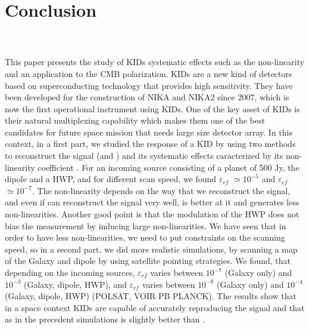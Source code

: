 
\section{Conclusion}
\label{conclusion}

\\

\\

This paper presents the study of KIDs systematic effects such as the non-linearity and an application to the CMB polarization. 
KIDs are a new kind of detectors based on superconducting technology that provides high sensitivity. They have been developed for the construction of NIKA and NIKA2 since 2007, which is now the first operational instrument using KIDs. One of the key asset of KIDs is their natural multiplexing capability which makes them one of the best candidates for future space mission that needs large size detector array. In this context, in a first part, we studied the response of a KID by using two methods to reconstruct the signal (\rf and \cf) and its systematic effects caracterized by its non-linearity coefficient \eps. For an incoming source consisting of a planet of 500 Jy, the dipole and a HWP, and for different scan speed, we found $\varepsilon_{rf}$ $\simeq 10^{-5}$ and $\varepsilon_{cf}$ $\simeq 10^{-7}$. The non-linearity depends on the way that we reconstruct the signal, and even if \rf can reconstruct the signal very well, \cf is better at it and generates less non-linearities. Another good point is that the modulation of the HWP does not bias the measurement by inducing large non-linearities. We have seen that in order to have less non-linearities, we need to put constraints on the scanning speed, so in a second part, we did more realistic simulations, by scanning a map of the Galaxy and dipole by using satellite pointing strategies. We found, that depending on the incoming sources, $\varepsilon_{rf}$ varies between $10^{-7}$ (Galaxy only) and $10^{-3}$ (Galaxy, dipole, HWP), and $\varepsilon_{cf}$ varies between $10^{-8}$ (Galaxy only) and $10^{-4}$ (Galaxy, dipole, HWP) (POLSAT, VOIR PB PLANCK). The results show that in a space context KIDs are capable of accurately reproducing the signal and that as in the precedent simulations \cf is slightly better than \rf.\\
